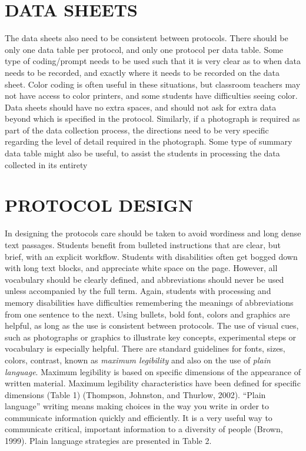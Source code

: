 \documentclass[11.5pt]{sig-alternate} %
\begin{document}
\begin{large}
\section*{DATA SHEETS}

The data sheets also need to be consistent between protocols. There should be only one data table per protocol, and only one protocol per data table. Some type of coding/prompt needs to be used such that it is very clear as to when data needs to be recorded, and exactly where it needs to be recorded on the data sheet. Color coding is often useful in these situations, but classroom teachers may not have access to color printers, and some students have difficulties seeing color. Data sheets should have no extra spaces, and should not ask for extra data beyond which is specified in the protocol. Similarly, if a photograph is required as part of the data collection process, the directions need to be very specific regarding the level of detail required in the photograph. Some type of summary data table might also be useful, to assist the students in processing the data collected in its entirety

\section*{PROTOCOL DESIGN}

In designing the protocols care should be taken to avoid wordiness and long dense text passages. Students benefit from bulleted instructions that are clear, but brief, with an explicit workflow. Students with disabilities often get bogged down with long text blocks, and appreciate white space on the page. However, all vocabulary should be clearly defined, and abbreviations should never be used unless accompanied by the full term. Again, students with processing and memory disabilities have difficulties remembering the meanings of abbreviations from one sentence to the next. Using bullets, bold font, colors and graphics are helpful, as long as the use is consistent between protocols. The use of visual cues, such as photographs or graphics to illustrate key concepts, experimental steps or vocabulary is especially helpful. There are standard guidelines for fonts, sizes, colors, contrast, known as \textit{maximum legibility} and also on the use of \textit{plain language}. Maximum legibility is based on specific dimensions of the appearance of written material. Maximum legibility characteristics have been defined for specific dimensions (Table 1) (Thompson, Johnston, and Thurlow, 2002). “Plain language” writing means making choices in the way you write in order to communicate information quickly and efficiently. It is a very useful way to communicate critical, important information to a diversity of people (Brown, 1999). Plain language strategies are presented in Table 2. 


\end{large}
\end{document}
